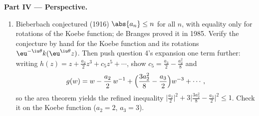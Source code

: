 \begin{problem}
\medskip
\noindent\textbf{Part IV --- Perspective.}
\begin{enumerate}[resume]
  \item Bieberbach conjectured (1916) $\abs{a_n} \leq n$ for
        all $n$, with equality only for rotations of the
        Koebe function; de Branges proved it in 1985. Verify
        the conjecture by hand for the Koebe function and its
        rotations $\eu^{-\iu\theta}k(\eu^{\iu\theta}z)$. Then
        push question 4's expansion one term further: writing
        $h(z) = z + \frac{a_2}2z^3 + c_5z^5 + \cdots$, show
        $c_5 = \frac{a_3}2 - \frac{a_2^2}8$ and
        \[
        g(w) = w - \frac{a_2}{2}\,w^{-1} +
        \Bigl(\frac{3a_2^2}8 - \frac{a_3}2\Bigr)w^{-3} +
        \cdots ,
        \]
        so the area theorem yields the refined inequality
        $\bigl|\frac{a_2}2\bigr|^2 + 3\bigl|\frac{3a_2^2}8 -
        \frac{a_3}2\bigr|^2 \leq 1$. Check it on the Koebe
        function ($a_2 = 2$, $a_3 = 3$).
\end{enumerate}


\end{problem}
